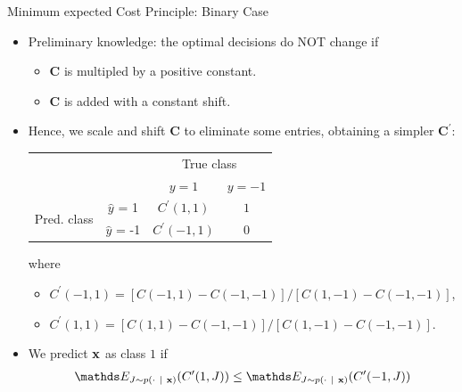\documentclass[11pt,compress,t,notes=noshow, xcolor=table]{beamer}
\begin{document}
\begin{vbframe}{Minimum expected Cost Principle: Binary Case}
	\footnotesize{
		\begin{itemize}
            \footnotesize
            \item Preliminary knowledge: the optimal decisions do NOT change if 
            \begin{itemize}
                \footnotesize
                \item $\mathbf{C}$ is multipled by a positive constant.
                \item $\mathbf{C}$ is added with a constant shift.
            \end{itemize}

            \item Hence, we scale and shift $\mathbf{C}$ to eliminate some entries, obtaining a simpler $\mathbf{C}^\prime$: 
            \begin{table}[]
                \centering
                    \begin{tabular}{cc|cc}
        			& &\multicolumn{2}{c}{True class} \\
        			& & $y=1$ & $y=-1$  \\
        			\hline
        			\multirow{2}{*}{\parbox{0.3cm}{Pred.  class}} & $\hat y$ = 1 & $C^\prime(1,1)$ & $1$ \\
        			& $\hat y$ = -1 & $C^\prime(-1, 1)$ & 0\\
                \end{tabular}
            \end{table}
            where 
            \begin{itemize}
                \footnotesize
                \item $C^\prime (-1, 1) = [C(-1, 1) - C(-1, -1)] / [C(1, -1) - C(-1, -1)]$,
                \item $C^\prime (1, 1) = [C(1, 1) - C(-1, -1)] / [C(1, -1) - C(-1,-1)]$.
            \end{itemize}

            \item We predict $\mathbf{x}$ as class $1$ if \\
            \begin{align*}
                \E_{J \sim p(\cdot ~|~ \xv)}( C^\prime(1,J) )  \leq \E_{J \sim p(\cdot ~|~ \xv)}( C^\prime(-1,J) ) \\
            \end{align*}


\end{itemize}}
\end{vbframe}
\end{document}
